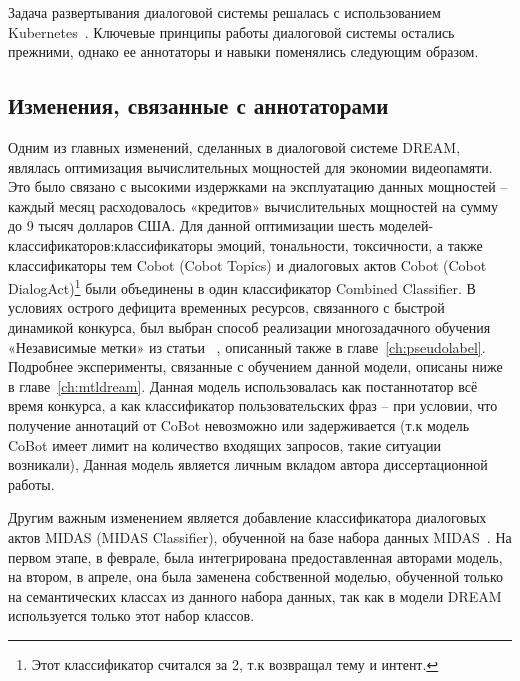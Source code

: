 Задача развертывания диалоговой системы решалась с использованием Kubernetes~\cite{kubernetes}.
Ключевые принципы работы диалоговой системы остались прежними, однако ее аннотаторы и навыки поменялись следующим образом.

\subsection{Изменения, связанные с аннотаторами}\label{dream:2:ann}

Одним из главных изменений, сделанных в диалоговой системе DREAM, являлась оптимизация вычислительных мощностей для экономии видеопамяти. Это было связано с высокими издержками на эксплуатацию данных мощностей -- каждый месяц расходовалось «кредитов» вычислительных мощностей на сумму до 9 тысяч долларов США. Для данной оптимизации шесть моделей-классификаторов:классификаторы эмоций, тональности, токсичности, а также классификаторы тем Cobot (Cobot Topics) и диалоговых актов Cobot (Cobot DialogAct)\footnote{Этот классификатор считался за 2, т.к возвращал тему и интент.} были объединены в один классификатор Combined Classifier. В условиях острого дефицита временных ресурсов, связанного с быстрой динамикой конкурса, был выбран способ реализации многозадачного обучения «Независимые метки» из статьи ~\cite{pseudolabel}, описанный также в главе~\ref{ch:pseudolabel}. Подробнее эксперименты, связанные с обучением данной модели, описаны ниже в главе~\ref{ch:mtldream}. Данная модель использовалась как постаннотатор всё время конкурса, а как классификатор пользовательских фраз -- при условии, что получение аннотаций от CoBot невозможно или задерживается (т.к модель CoBot имеет лимит на количество входящих запросов, такие ситуации возникали),  Данная модель является личным вкладом автора диссертационной работы.

Другим важным изменением является добавление классификатора диалоговых актов MIDAS (MIDAS Classifier), обученной на базе набора данных MIDAS~\cite{midas}. На первом этапе, в феврале, была интегрирована предоставленная авторами модель, на втором, в апреле, она была заменена собственной моделью, обученной только на семантических классах из данного набора данных, так как в модели {DREAM} используется только этот набор классов.


